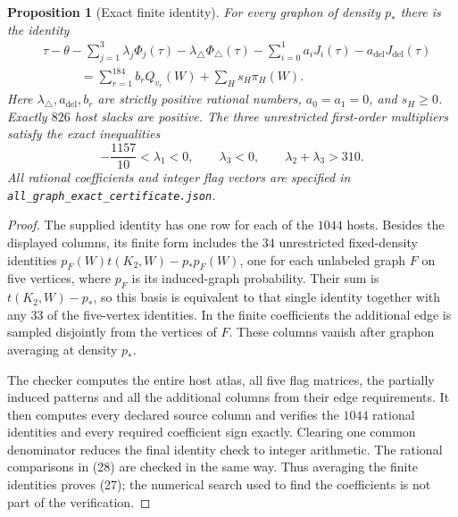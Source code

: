\documentclass[11pt]{amsart}
\newtheorem{proposition}[theorem]{Proposition}
\theoremstyle{definition}
\theoremstyle{remark}
\begin{document}
\begin{proposition}[Exact finite identity]\label{prop:finite-certificate}
For every graphon of density \(p_*\) there is the identity
\begin{equation}
 \begin{aligned}
 &\tau-\theta-\sum_{j=1}^3\lambda_j\Phi_j(\tau)
       -\lambda_\triangle\Phi_\triangle(\tau)
       -\sum_{i=0}^1a_iJ_i(\tau)-a_{\mathrm{del}}J_{\mathrm{del}}(\tau)\\
 &\hspace{3em}
       =\sum_{r=1}^{184}b_rQ_{v_r}(W)+\sum_Hs_H\pi_H(W).
 \end{aligned}\tag{27}
\end{equation}
Here \(\lambda_\triangle,a_{\mathrm{del}},b_r\) are strictly positive
rational numbers, \(a_0=a_1=0\), and \(s_H\ge0\). Exactly \(826\) host
slacks are positive. The three unrestricted first-order multipliers
satisfy the exact inequalities
\begin{equation}
 -\frac{1157}{10}<\lambda_1<0,\qquad
 \lambda_3<0,\qquad\lambda_2+\lambda_3>310.\tag{28}
\end{equation}
All rational coefficients and integer flag vectors are specified in
\texttt{\upshape all\_\allowbreak graph\_\allowbreak exact\_\allowbreak certificate.json}.
\end{proposition}
\begin{proof}
The supplied identity has one row for each of the \(1044\) hosts.
Besides the displayed columns, its finite form includes the \(34\)
unrestricted fixed-density identities
\(p_F(W)t(K_2,W)-p_*p_F(W)\), one for each unlabeled graph \(F\) on
five vertices, where \(p_F\) is its induced-graph probability.
Their sum is \(t(K_2,W)-p_*\), so this basis is equivalent to that
single identity together with any \(33\) of the five-vertex identities.
In the finite coefficients the additional edge is sampled disjointly
from the vertices of \(F\). These columns vanish after graphon averaging
at density \(p_*\).

The checker computes the entire host atlas, all five flag matrices,
the partially induced patterns and all the additional columns from their
edge requirements. It then computes every declared source column and
verifies the \(1044\) rational identities and every required coefficient
sign exactly. Clearing one
common denominator reduces the final identity check to integer arithmetic.
The rational comparisons in (28) are checked in the same way. Thus
averaging the finite identities proves (27); the numerical search used
to find the coefficients is not part of the verification.
\end{proof}
\end{document}
